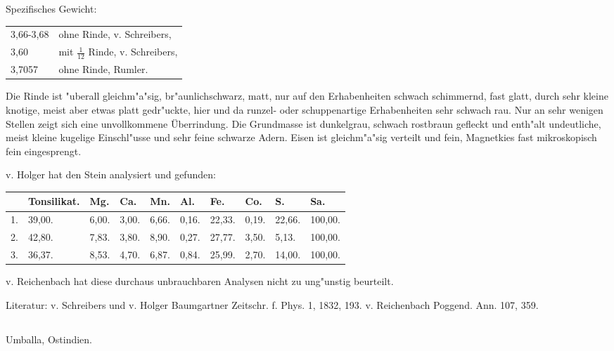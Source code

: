 \documentclass[a4paper, 11pt, oneside]{article}
\begin{document}
Spezifisches Gewicht:  
\begin{table}[!ht]
    \centering\swabfamily\Large
    \begin{tabular}{l l}
        3,66-3,68 & ohne Rinde, v. Schreibers,\\
        3,60 & mit $\mathfrak{\frac{1}{12}}$ Rinde, v. Schreibers,\\
        3,7057 & ohne Rinde, Rumler.
    \end{tabular}
\end{table}

Die Rinde ist "uberall gleichm"a"sig, br"aunlichschwarz, matt, nur auf den Erhabenheiten schwach schimmernd, fast glatt, durch sehr kleine knotige, meist aber etwas platt gedr"uckte, hier und da runzel- oder schuppenartige Erhabenheiten sehr schwach rau. Nur an sehr wenigen Stellen zeigt sich eine unvollkommene Überrindung. Die Grundmasse ist dunkelgrau, schwach rostbraun gefleckt und enth"alt undeutliche, meist kleine kugelige Einschl"usse und sehr feine schwarze Adern. Eisen ist gleichm"a"sig verteilt und fein, Magnetkies fast mikroskopisch fein eingesprengt.

v. Holger hat den Stein analysiert und gefunden:
\begin{table}[!ht]
    \centering\swabfamily\Large
    \normalsize
    \begin{tabular}{l l l l l l l l l l}
         & Tonsilikat. & Mg. & Ca. & Mn. & Al. & Fe. & Co. & S. & Sa. \\ \hline
        1. & 39,00. & 6,00. & 3,00. & 6,66. & 0,16. & 22,33. & 0,19. & 22,66. & 100,00. \\
        2. & 42,80. & 7,83. & 3,80. & 8,90. & 0,27. & 27,77. & 3,50. & 5,13. & 100,00. \\
        3. & 36,37. & 8,53. & 4,70. & 6,87. & 0,84. & 25,99. & 2,70. & 14,00. & 100,00. \\
    \end{tabular}
\end{table}

v. Reichenbach hat diese durchaus unbrauchbaren Analysen nicht zu ung"unstig beurteilt.

\normalsize
Literatur: v. Schreibers und v. Holger Baumgartner Zeitschr. f. Phys. 1, 1832, 193. v. Reichenbach Poggend. Ann. 107, 359.

\subsection{}
\LARGE
\paragraph{}
Umballa, Ostindien.
\end{document}

